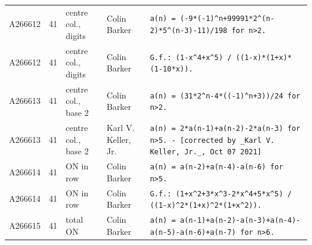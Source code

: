 \documentclass[11pt]{article}
\theoremstyle{definition}
\theoremstyle{remark}
\begin{document}
{\begin{longtable}{p{1.3cm}p{0.7cm}p{2.4cm}p{2.3cm}p{7.3cm}}
A266612 & 41 & centre col., digits & Colin Barker & \texttt{a(n)\allowbreak{} \allowbreak{}=\allowbreak{} \allowbreak{}(-\allowbreak{}9*\allowbreak{}(-\allowbreak{}1)\allowbreak{}\^{}n+\allowbreak{}99991*\allowbreak{}2\^{}(n-\allowbreak{}2)\allowbreak{}*\allowbreak{}5\^{}(n-\allowbreak{}3)\allowbreak{}-\allowbreak{}11)\allowbreak{}/\allowbreak{}198 \allowbreak{}for \allowbreak{}n>2.} \\
A266612 & 41 & centre col., digits & Colin Barker & \texttt{G.f.: \allowbreak{}(1-\allowbreak{}x\^{}4+\allowbreak{}x\^{}5)\allowbreak{} \allowbreak{}/\allowbreak{} \allowbreak{}((1-\allowbreak{}x)\allowbreak{}*\allowbreak{}(1+\allowbreak{}x)\allowbreak{}*\allowbreak{}(1-\allowbreak{}10*\allowbreak{}x)\allowbreak{})\allowbreak{}.} \\
A266613 & 41 & centre col., base 2 & Colin Barker & \texttt{a(n)\allowbreak{} \allowbreak{}=\allowbreak{} \allowbreak{}(31*\allowbreak{}2\^{}n-\allowbreak{}4*\allowbreak{}((-\allowbreak{}1)\allowbreak{}\^{}n+\allowbreak{}3)\allowbreak{})\allowbreak{}/\allowbreak{}24 \allowbreak{}for \allowbreak{}n>2.} \\
A266613 & 41 & centre col., base 2 & Karl V. Keller, Jr. & \texttt{a(n)\allowbreak{} \allowbreak{}=\allowbreak{} \allowbreak{}2*\allowbreak{}a(n-\allowbreak{}1)\allowbreak{}+\allowbreak{}a(n-\allowbreak{}2)\allowbreak{}-\allowbreak{}2*\allowbreak{}a(n-\allowbreak{}3)\allowbreak{} \allowbreak{}for \allowbreak{}n>5. \allowbreak{}-\allowbreak{} \allowbreak{}[corrected \allowbreak{}by \allowbreak{}\_Karl \allowbreak{}V. \allowbreak{}Keller,\allowbreak{} \allowbreak{}Jr.\_,\allowbreak{} \allowbreak{}Oct \allowbreak{}07 \allowbreak{}2021]} \\
A266614 & 41 & ON in row & Colin Barker & \texttt{a(n)\allowbreak{} \allowbreak{}=\allowbreak{} \allowbreak{}a(n-\allowbreak{}2)\allowbreak{}+\allowbreak{}a(n-\allowbreak{}4)\allowbreak{}-\allowbreak{}a(n-\allowbreak{}6)\allowbreak{} \allowbreak{}for \allowbreak{}n>5.} \\
A266614 & 41 & ON in row & Colin Barker & \texttt{G.f.: \allowbreak{}(1+\allowbreak{}x\^{}2+\allowbreak{}3*\allowbreak{}x\^{}3-\allowbreak{}2*\allowbreak{}x\^{}4+\allowbreak{}5*\allowbreak{}x\^{}5)\allowbreak{} \allowbreak{}/\allowbreak{} \allowbreak{}((1-\allowbreak{}x)\allowbreak{}\^{}2*\allowbreak{}(1+\allowbreak{}x)\allowbreak{}\^{}2*\allowbreak{}(1+\allowbreak{}x\^{}2)\allowbreak{})\allowbreak{}.} \\
A266615 & 41 & total ON & Colin Barker & \texttt{a(n)\allowbreak{} \allowbreak{}=\allowbreak{} \allowbreak{}a(n-\allowbreak{}1)\allowbreak{}+\allowbreak{}a(n-\allowbreak{}2)\allowbreak{}-\allowbreak{}a(n-\allowbreak{}3)\allowbreak{}+\allowbreak{}a(n-\allowbreak{}4)\allowbreak{}-\allowbreak{}a(n-\allowbreak{}5)\allowbreak{}-\allowbreak{}a(n-\allowbreak{}6)\allowbreak{}+\allowbreak{}a(n-\allowbreak{}7)\allowbreak{} \allowbreak{}for \allowbreak{}n>6.} \\

\end{longtable}}
\end{document}
